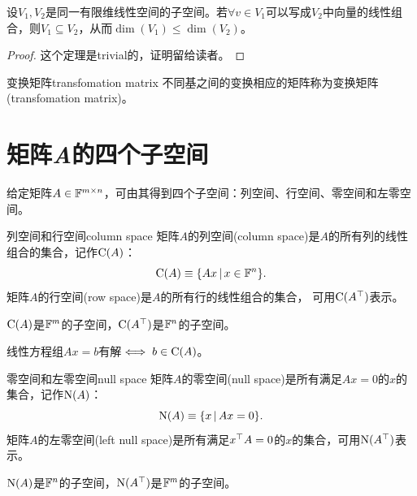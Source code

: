 \begin{theorem}{}{}
	设$V_1,V_2$是同一有限维线性空间的子空间。若$\forall v \in V_1$可以写成$V_2$中向量的线性组合，则$V_1 \subseteq V_2$，从而$\dim(V_1) \leqslant \dim(V_2)$。
\end{theorem}

\begin{proof}
	这个定理是trivial的，证明留给读者。
\end{proof}

\begin{definition}{变换矩阵}{transfomation matrix}
	不同基之间的变换相应的矩阵称为变换矩阵(transfomation matrix)。
\end{definition}

\section{矩阵\textit{A}的四个子空间}

给定矩阵$A \in \mathbb{F}^{m\times n}$，可由其得到四个子空间：列空间、行空间、零空间和左零空间。
\begin{definition}{列空间和行空间}{column space}
	矩阵$A$的列空间(column space)是$A$的所有列的线性组合的集合，记作$\operatorname{C}(A)$：
	\begin{equation}
		\operatorname{C}(A) \equiv \{Ax\,\vert\,x \in \mathbb{F}^n\}.
	\end{equation}
	\tcblower
	矩阵$A$的行空间(row space)是$A$的所有行的线性组合的集合，%
	可用$\operatorname{C}(A^\top)$表示。
\end{definition}

\begin{corollary}
	$\operatorname{C}(A)$是$\mathbb{F}^m$的子空间，$\operatorname{C}(A^\top)$是$\mathbb{F}^n$的子空间。
\end{corollary}

\begin{remark}
	线性方程组$Ax = b$有解$\iff b \in \operatorname{C}(A)$。
\end{remark}

\begin{definition}{零空间和左零空间}{null space}
	矩阵$A$的零空间(null space)是所有满足$Ax = 0$的$x$的集合，记作$\operatorname{N}(A)$：
	\begin{equation}
		\operatorname{N}(A) \equiv \{x\,\vert\,Ax = 0\}.
	\end{equation}
	\tcblower
	矩阵$A$的左零空间(left null space)是所有满足$x^\top A = 0$的$x$的集合，可用$\operatorname{N}(A^\top)$表示。
\end{definition}

\begin{corollary}
	$\operatorname{N}(A)$是$\mathbb{F}^n$的子空间，$\operatorname{N}(A^\top)$是$\mathbb{F}^m$的子空间。
\end{corollary}

